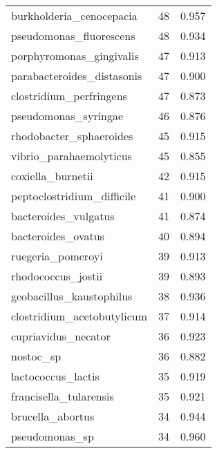 \begin{tabular}{lrr}
                    burkholderia\_cenocepacia &                  48 &     0.957 \\
                     pseudomonas\_fluorescens &                  48 &     0.934 \\
                    porphyromonas\_gingivalis &                  47 &     0.913 \\
                  parabacteroides\_distasonis &                  47 &     0.900 \\
                     clostridium\_perfringens &                  47 &     0.873 \\
                        pseudomonas\_syringae &                  46 &     0.876 \\
                     rhodobacter\_sphaeroides &                  45 &     0.915 \\
                     vibrio\_parahaemolyticus &                  45 &     0.855 \\
                           coxiella\_burnetii &                  42 &     0.915 \\
                  peptoclostridium\_difficile &                  41 &     0.900 \\
                        bacteroides\_vulgatus &                  41 &     0.874 \\
                          bacteroides\_ovatus &                  40 &     0.894 \\
                           ruegeria\_pomeroyi &                  39 &     0.913 \\
                          rhodococcus\_jostii &                  39 &     0.893 \\
                    geobacillus\_kaustophilus &                  38 &     0.936 \\
                  clostridium\_acetobutylicum &                  37 &     0.914 \\
                         cupriavidus\_necator &                  36 &     0.923 \\
                                   nostoc\_sp &                  36 &     0.882 \\
                          lactococcus\_lactis &                  35 &     0.919 \\
                      francisella\_tularensis &                  35 &     0.921 \\
                            brucella\_abortus &                  34 &     0.944 \\
                              pseudomonas\_sp &                  34 &     0.960 \\

\end{tabular}
